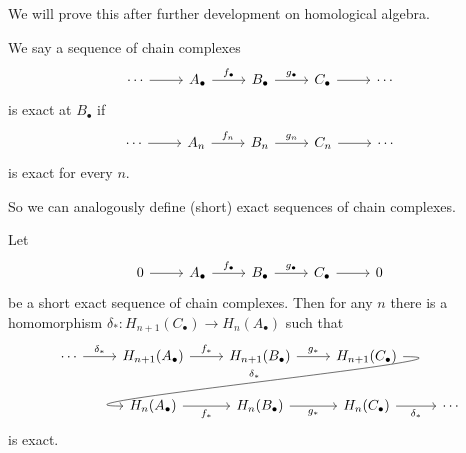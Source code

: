 We will prove this after further development on homological algebra.
\begin{definition}
    We say a sequence of chain complexes
    \[
        \begin{tikzcd}
            \cdots\arrow{r}&A_\bullet\arrow{r}{f_\bullet}&B_\bullet\arrow{r}{g_\bullet}&C_\bullet\arrow{r}&\cdots
        \end{tikzcd}
    \]
    is exact at $B_\bullet$ if
    \[
        \begin{tikzcd}
            \cdots\arrow{r}&A_n\arrow{r}{f_n}&B_n\arrow{r}{g_n}&C_n\arrow{r}&\cdots
        \end{tikzcd}
    \]
    is exact for every $n$.
\end{definition}
So we can analogously define (short) exact sequences of chain complexes.
\begin{lemma}
    Let
    \[
        \begin{tikzcd}
            0\arrow{r}&A_\bullet\arrow{r}{f_\bullet}&B_\bullet\arrow{r}{g_\bullet}&C_\bullet\arrow{r}&0
        \end{tikzcd}
    \]
    be a short exact sequence of chain complexes.
    Then for any $n$ there is a homomorphism $\delta_\ast:H_{n+1}(C_\bullet)\to H_n(A_\bullet)$ such that
    \[
        \begin{tikzcd}
            \cdots\arrow{r}{\delta_\ast}&H_{n+1}(A_\bullet)\arrow{r}{f_\ast}&H_{n+1}(B_\bullet)\arrow{r}{g_\ast}&H_{n+1}(C_\bullet)\arrow[swap,overlay,out=0,in=180]{dll}{\delta_\ast}&\\
            &H_n(A_\bullet)\arrow[swap]{r}{f_\ast}&H_n(B_\bullet)\arrow[swap]{r}{g_\ast}&H_n(C_\bullet)\arrow[swap]{r}{\delta_\ast}&\cdots
        \end{tikzcd}
    \]
    is exact.
\end{lemma}
